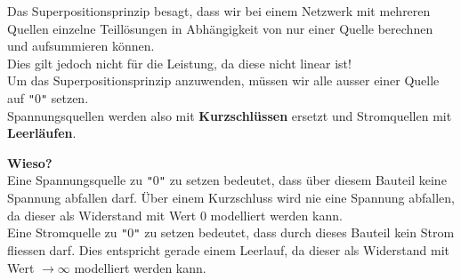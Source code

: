 Das Superpositionsprinzip besagt, dass wir bei einem Netzwerk mit mehreren Quellen einzelne Teillösungen in Abhängigkeit von nur einer Quelle berechnen und aufsummieren können. \\
Dies gilt jedoch nicht für die Leistung, da diese nicht linear ist! \\
Um das Superpositionsprinzip anzuwenden, müssen wir alle ausser einer Quelle auf \texttt{"}0\texttt{"} setzen. \\
Spannungsquellen werden also mit \textbf{Kurzschlüssen} ersetzt und Stromquellen mit \textbf{Leerläufen}. \\
\begin{center}
	\fix
\end{center}


\textbf{Wieso?} \\
Eine Spannungsquelle zu \texttt{"}0\texttt{"} zu setzen bedeutet, dass über diesem Bauteil keine Spannung abfallen darf. Über einem Kurzschluss wird nie eine Spannung abfallen, da dieser als Widerstand mit Wert 0 modelliert werden kann. \\
Eine Stromquelle zu \texttt{"}0\texttt{"} zu setzen bedeutet, dass durch dieses Bauteil kein Strom fliessen darf. Dies entspricht gerade einem Leerlauf, da dieser als Widerstand mit Wert $\displaystyle \rightarrow \infty$ modelliert werden kann. \\

\newpage


